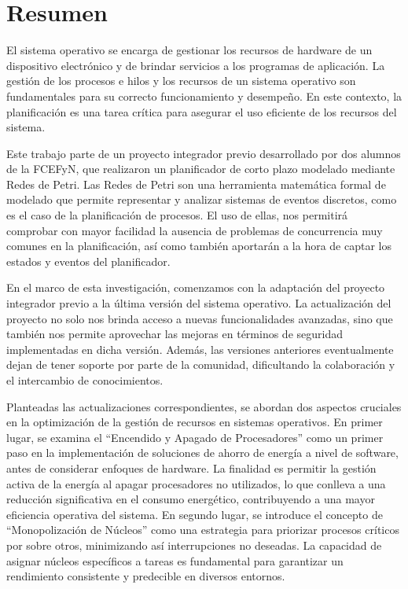 \chapter*{Resumen}

El sistema operativo se encarga de gestionar los recursos de hardware de un dispositivo electrónico y de brindar servicios a los programas de aplicación. La gestión de los procesos e hilos y los recursos de un sistema operativo son fundamentales para su correcto funcionamiento y desempeño. En este contexto, la planificación es una tarea crítica para asegurar el uso eficiente de los recursos del sistema.

Este trabajo parte de un proyecto integrador previo desarrollado por dos alumnos de la FCEFyN, que realizaron un planificador de corto plazo modelado mediante Redes de Petri. Las Redes de Petri son una herramienta matemática formal de modelado que permite representar y analizar sistemas de eventos discretos, como es el caso de la planificación de procesos. El uso de ellas, nos permitirá comprobar con mayor facilidad la ausencia de problemas de concurrencia muy comunes en la planificación, así como también aportarán a la hora de captar los estados y eventos del planificador.

En el marco de esta investigación, comenzamos con la adaptación del proyecto integrador previo a la última versión del sistema operativo. La actualización del proyecto no solo nos brinda acceso a nuevas funcionalidades avanzadas, sino que también nos permite aprovechar las mejoras en términos de seguridad implementadas en dicha versión. Además, las versiones anteriores eventualmente dejan de tener soporte por parte de la comunidad, dificultando la colaboración y el intercambio de conocimientos.

Planteadas las actualizaciones correspondientes, se abordan dos aspectos cruciales en la optimización de la gestión de recursos en sistemas operativos. En primer lugar, se examina el ``Encendido y Apagado de Procesadores'' como un primer paso en la implementación de soluciones de ahorro de energía a nivel de software, antes de considerar enfoques de hardware. La finalidad es permitir la gestión activa de la energía al apagar procesadores no utilizados, lo que conlleva a una reducción significativa en el consumo energético, contribuyendo a una mayor eficiencia operativa del sistema. En segundo lugar, se introduce el concepto de ``Monopolización de Núcleos'' como una estrategia para priorizar procesos críticos por sobre otros, minimizando así interrupciones no deseadas. La capacidad de asignar núcleos específicos a tareas es fundamental para garantizar un rendimiento consistente y predecible en diversos entornos.
